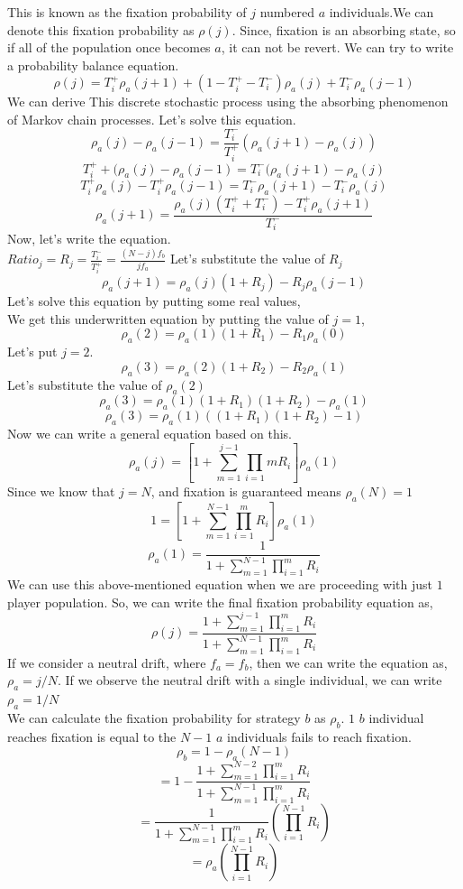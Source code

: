 \documentclass{article}
\begin{document}
This is known as the fixation probability of $j$ numbered $a$ individuals.We can denote this fixation probability as $\rho(j)$.
Since, fixation is an absorbing state, so if all of the population once becomes $a$, it can not be revert. We can try to write a probability balance equation.
\[\rho(j)=T_i^+\rho_a(j+1)+(1-T_i^+-T_i^-)\rho_a(j)+T_i^-\rho_a(j-1)\]
We can derive This discrete stochastic process using the absorbing phenomenon of Markov chain processes.
Let's solve this equation.
\[\rho_a(j)-\rho_a(j-1)=\frac{T_i^-}{T_i^+}(\rho_a(j+1)-\rho_a(j))\]
\[T_i^++(\rho_a(j)-\rho_a(j-1)=T_i^-(\rho_a(j+1)-\rho_a(j)\]
\[T_i^+\rho_a(j)-T_i^+\rho_a(j-1)=T_i^-\rho_a(j+1)-T_i^-\rho_a(j)\]
\[\rho_a(j+1)=\frac{\rho_a(j)(T_i^+ + T_i^-)-T_i^+\rho_a(j+1)}{T_i^-}\]
 Now, let's write the equation.\\
 $Ratio_j=R_j=\frac{T_i^-}{T_i^+}= \frac{(N-j)f_b}{jf_a}$
 Let's substitute the value of $R_j$
 \[\rho_a(j+1)={\rho_a(j)(1+R_j)-R_j\rho_a(j-1)}\]
 Let's solve this equation by putting some real values,\\
 We get this underwritten equation by putting the value of $j=1$,
 \[\rho_a(2)= \rho_a(1)(1+R_1)-R_1\rho_a(0)\]
 Let's put $j=2$.
 \[\rho_a(3)=\rho_a(2)(1+R_2)-R_2\rho_a(1)\]
 Let's substitute the value of $\rho_a(2)$
 \[\rho_a(3)=\rho_a(1)(1+R_1)(1+R_2)-\rho_a(1)\]
 \[\rho_a(3)=\rho_a(1)((1+R_1)(1+R_2)-1)\]
 Now we can write a general equation based on this.
 \[\rho_a(j)=\left[1+\sum_{m=1}^{j-1}\prod_{i=1}{m}R_i \right] \rho_a(1)\]
 Since we know that $j=N$, and fixation is guaranteed means $\rho_a(N)=1$
 \[1=\left[1+\sum_{m=1}^{N-1}\prod_{i=1}^{m} R_i\right]\rho_a(1)\]
 \[\rho_a(1)=\frac{1}{1+\sum_{m=1}^{N-1}\prod_{i=1}^{m}R_i}\]
 We can use this above-mentioned equation when we are proceeding with just $1$ player population.
 So, we can write the final fixation probability equation as,
 \[\rho(j)=\frac{1+\sum_{m=1}^{j-1}\prod_{i=1}^{m}R_i}{1+\sum_{m=1}^{N-1}\prod_{i=1}^{m}R_i}\]
 If we consider a neutral drift, where $f_a=f_b$, then we can write the equation as, $\rho_a={j}/{N}$.
 If we observe the neutral drift with a single individual, we can write $\rho_a=1/N$\cite{Traulsen2006}\\

 We can calculate the fixation probability for strategy $b$ as $\rho_b$. $1$ $b$ individual reaches fixation is equal to the $N-1$ $a$ individuals fails to reach fixation.
\[\rho_b=1-\rho_a(N-1)\]
\[=1-\frac{1 + \sum_{m=1}^{N-2} \prod_{i=1}^{m} R_i}{1 + \sum_{m=1}^{N-1} \prod_{i=1}^{m} R_i}\]
\[=\frac{1}{1+\sum_{m=1}^{N-1}\prod_{i=1}^{m}R_i}(\prod_{i=1}^{N-1}R_i)\]
\[=\rho_a(\prod_{i=1}^{N-1}R_i)\]
\end{document}
